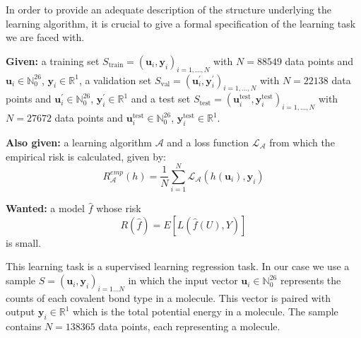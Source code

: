 \begin{comment}
Some detail needs to be added about removing the n.a. values of $D_{dist}$ and how this matrix is used to create the input/output pairs $u_{i}$ (atom counts in molecule) and $y_{i}$ p energy levels.

We now have a set of labeled training data that is the sample $S = (u_{i}, y_{i})_{i=1 ... M}$. for which the input $u_{i} \in \mathbb{R}^{26}$, the output $y_{i} \in \mathbb{R}^1$ and the number of molecules $M = 138359$. Of these 138359 data points, we want 80\% to serve as the training set $T = (u_{i}, y_{i})_{i=1 ... N^{t}}$ with $N^{t} = 110687$ and 20\% as a validation set $V = (u_{i}, y_{i}')_{i=1} ... N'$ with $N^{v} = 27672$.
\end{comment}

In order to provide an adequate description of the structure underlying the learning algorithm, it is crucial to give a formal specification of the learning task we are faced with.

\textbf{Given:} a training set $S_{\text{train}} = (\textbf{u}_i, \textbf{y}_i)_{i=1, \dots, N}$ with $N = 88549$ data points and $\textbf{u}_i \in \mathbb{N}_0^{26}$, $\textbf{y}_i \in \mathbb{R}^1$, 
a validation set $S_{\text{val}} = (\textbf{u}^{\prime}_i, \textbf{y}^{\prime}_i)_{i=1, \dots, N}$ with $N = 22138$ data points and $\textbf{u}^{\prime}_i \in \mathbb{N}_0^{26}$, $\textbf{y}^{\prime}_i \in \mathbb{R}^1$
and a test set $S_{\text{test}} = (\textbf{u}^{\text{test}}_i, \textbf{y}^{\text{test}}_i)_{i=1, \dots, N}$ with $N = 27672$ data points and $\textbf{u}^{\text{test}}_i \in \mathbb{N}_0^{26}$, $\textbf{y}^{\text{test}}_i \in \mathbb{R}^1$.

\textbf{Also given:} a learning algorithm $\mathcal{A}$ and a loss function $\mathcal{L}_\mathcal{A}$ from which the empirical risk is calculated, given by:
\begin{equation}
    R^{emp}_{\mathcal{A}}(h) = \frac{1}{N} \sum^{N}_{i=1} \mathcal{L}_\mathcal{A} (h(\textbf{u}_i), \textbf{y}_i)
\end{equation}

\textbf{Wanted:} a model $\hat{f}$ whose risk
\begin{equation}
    R(\hat{f}) = E[L(\hat{f}(U), Y)]
    \label{eqn:risk}
\end{equation}
is small.


This learning task is a supervised learning regression task. In our case we use a sample $S = (\textbf{u}_i, \textbf{y}_i)_{i=1 ... N}$ in which the input vector $\textbf{u}_i \in \mathbb{N}_0^{26}$ represents the counts of each covalent bond type in a molecule. This vector is paired with output $\textbf{y}_i \in \mathbb{R}^{1}$ which is the total potential energy in a molecule. The sample contains $N  = 138365$ data points, each representing a molecule. 

